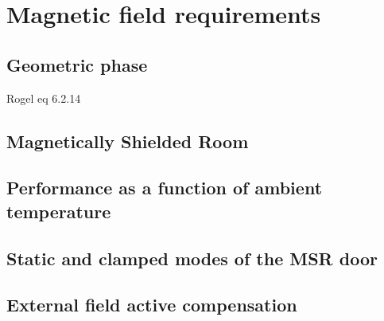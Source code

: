 
\section
{
    Magnetic field requirements\label{sec:magnetic_field_req}
}




\subsection{Geometric phase}


Rogel eq 6.2.14


\subsection{Magnetically Shielded Room}



\subsection{Performance as a function of ambient temperature}




\subsection{Static and clamped modes of the MSR door}



\subsection{External field active compensation}


